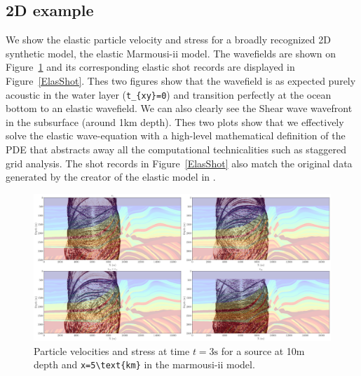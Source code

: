 \documentclass[conference]{IEEEtran}
\begin{document}
\subsection{2D example}\label{d-example}

We show the elastic particle velocity and stress for a broadly
recognized 2D synthetic model, the elastic
Marmousi-ii\cite{versteeg927, marmouelas} model. The wavefields are
shown on Figure~\ref{ElasWf} and its corresponding elastic shot records
are displayed in Figure~\ref{ElasShot}. Thes two figures show that the
wavefield is as expected purely acoustic in the water layer
(\texttt{t\_\{xy\}=0}) and transition perfectly at the ocean bottom to
an elastic wavefield. We can also clearly see the Shear wave wavefront
in the subsurface (around 1km depth). Thes two plots show that we
effectively solve the elastic wave-equation with a high-level
mathematical definition of the PDE that abstracts away all the
computational technicalities such as staggered grid analysis. The shot
records in Figure~\ref{ElasShot} also match the original data generated
by the creator of the elastic model in \cite{marmouelas}.

\begin{figure}
\centering
\includegraphics[width=1.000\hsize]{./Figures/marmou_snap.png}
\caption{Particle velocities and stress at time $t=3\text{s}$ for a
source at 10m depth and \texttt{x=5\textbackslash{}text\{km\}} in the
marmousi-ii model.}\label{ElasWf}
\end{figure}
\end{document}
